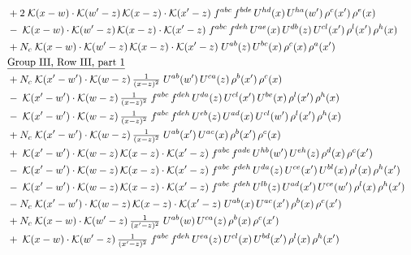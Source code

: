 \documentclass[10pt]{article}
\numberwithin{equation}{section}
\begin{document}
\begin{align}
&\quad +2\;\mathcal{K}(x-w)\cdot\mathcal{K}(w'-z)\,\mathcal{K}(x-z)\cdot\mathcal{K}(x'-z)\;f^{abc}\,f^{bde}\,U^{hd}(x)\,U^{ha}(w')\,\rho^{c}(x')\,\rho^{e}(x)\notag\\
&\quad -\;\mathcal{K}(x-w)\cdot\mathcal{K}(w'-z)\,\mathcal{K}(x-z)\cdot\mathcal{K}(x'-z)\;f^{abc}\,f^{deh}\,U^{ae}(x)\,U^{db}(z)\,U^{cl}(x')\,\rho^{l}(x')\,\rho^{h}(x)\notag\\
&\quad +N_c\;\mathcal{K}(x-w)\cdot\mathcal{K}(w'-z)\,\mathcal{K}(x-z)\cdot\mathcal{K}(x'-z)\;U^{ab}(z)\,U^{bc}(x)\,\rho^{c}(x)\,\rho^{a}(x')\notag\\
&\quad\underline{\text{Group III, Row III, part 1}}\notag\\
&\quad +N_c\;\mathcal{K}(x'-w')\cdot\mathcal{K}(w-z)\,\tfrac{1}{(x-z)^{2}}\;U^{ab}(w')\,U^{ca}(z)\,\rho^{b}(x')\,\rho^{c}(x)\notag\\
&\quad -\;\mathcal{K}(x'-w')\cdot\mathcal{K}(w-z)\,\tfrac{1}{(x-z)^{2}}\;f^{abc}\,f^{deh}\,U^{da}(z)\,U^{cl}(x')\,U^{be}(x)\,\rho^{l}(x')\,\rho^{h}(x)\notag\\
&\quad -\;\mathcal{K}(x'-w')\cdot\mathcal{K}(w-z)\,\tfrac{1}{(x-z)^{2}}\;f^{abc}\,f^{deh}\,U^{eb}(z)\,U^{ad}(x)\,U^{cl}(w')\,\rho^{l}(x')\,\rho^{h}(x)\notag\\
&\quad +N_c\;\mathcal{K}(x'-w')\cdot\mathcal{K}(w-z)\,\tfrac{1}{(x-z)^{2}}\;U^{ab}(x')\,U^{ac}(x)\,\rho^{b}(x')\,\rho^{c}(x)\notag\\
&\quad +\;\mathcal{K}(x'-w')\cdot\mathcal{K}(w-z)\,\mathcal{K}(x-z)\cdot\mathcal{K}(x'-z)\;f^{abc}\,f^{ade}\,U^{hb}(w')\,U^{eh}(z)\,\rho^{d}(x)\,\rho^{c}(x')\notag\\
&\quad -\;\mathcal{K}(x'-w')\cdot\mathcal{K}(w-z)\,\mathcal{K}(x-z)\cdot\mathcal{K}(x'-z)\;f^{abc}\,f^{deh}\,U^{da}(z)\,U^{ce}(x')\,U^{bl}(x)\,\rho^{l}(x)\,\rho^{h}(x')\notag\\
&\quad -\;\mathcal{K}(x'-w')\cdot\mathcal{K}(w-z)\,\mathcal{K}(x-z)\cdot\mathcal{K}(x'-z)\;f^{abc}\,f^{deh}\,U^{lb}(z)\,U^{ad}(x')\,U^{ce}(w')\,\rho^{l}(x)\,\rho^{h}(x')\notag\\
&\quad -N_c\;\mathcal{K}(x'-w')\cdot\mathcal{K}(w-z)\,\mathcal{K}(x-z)\cdot\mathcal{K}(x'-z)\;U^{ab}(x)\,U^{ac}(x')\,\rho^{b}(x)\,\rho^{c}(x')\notag\\
&\quad +N_c\;\mathcal{K}(x-w)\cdot\mathcal{K}(w'-z)\,\tfrac{1}{(x'-z)^{2}}\;U^{ab}(w)\,U^{ca}(z)\,\rho^{b}(x)\,\rho^{c}(x')\notag\\
&\quad +\;\mathcal{K}(x-w)\cdot\mathcal{K}(w'-z)\,\tfrac{1}{(x'-z)^{2}}\;f^{abc}\,f^{deh}\,U^{ea}(z)\,U^{cl}(x)\,U^{bd}(x')\,\rho^{l}(x)\,\rho^{h}(x')\notag\\

\end{align}
\end{document}
